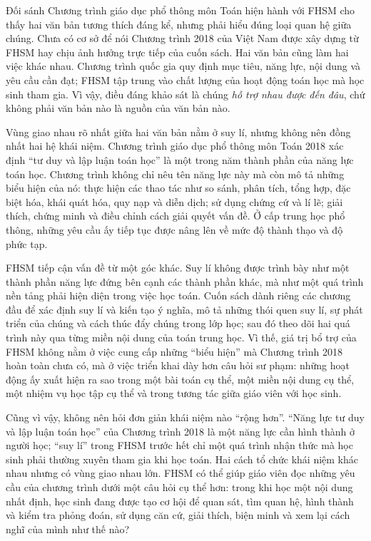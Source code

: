 Đối sánh Chương trình giáo dục phổ thông môn Toán hiện hành với FHSM cho thấy hai văn bản tương thích đáng kể, nhưng phải hiểu đúng loại quan hệ giữa chúng. Chưa có cơ sở để nói Chương trình 2018 của Việt Nam được xây dựng từ FHSM hay chịu ảnh hưởng trực tiếp của cuốn sách. Hai văn bản cũng làm hai việc khác nhau. Chương trình quốc gia quy định mục tiêu, năng lực, nội dung và yêu cầu
cần đạt; FHSM tập trung vào chất lượng của hoạt động toán học mà học sinh tham gia. Vì vậy, điều đáng khảo sát là chúng \emph{hỗ trợ nhau được đến đâu}, chứ không phải văn bản nào là nguồn của văn bản nào.

Vùng giao nhau rõ nhất giữa hai văn bản nằm ở suy lí, nhưng không nên đồng nhất hai hệ khái niệm. Chương trình giáo dục phổ thông môn Toán 2018 xác định “tư duy và lập luận toán học” là một trong năm thành phần của năng lực toán học. Chương trình không chỉ nêu tên năng lực này mà còn mô tả những biểu hiện của nó: thực hiện các thao tác như so sánh, phân tích, tổng hợp, đặc biệt hóa, khái quát hóa, quy nạp và diễn dịch; sử dụng chứng cứ và lí lẽ; giải thích, chứng minh và điều chỉnh cách giải quyết vấn đề. Ở cấp trung học phổ thông, những yêu cầu ấy tiếp tục được nâng lên về mức độ thành thạo và độ phức tạp.

FHSM tiếp cận vấn đề từ một góc khác. Suy lí không được trình bày như một thành phần năng lực đứng bên cạnh các thành phần khác, mà như một quá trình nền tảng phải hiện diện trong việc học toán. Cuốn sách dành riêng các chương đầu để xác định suy lí và kiến tạo ý nghĩa, mô tả những thói quen suy lí, sự phát triển của chúng và cách thúc đẩy chúng trong lớp học; sau đó theo dõi hai quá trình này qua từng miền nội dung của toán trung học. Vì thế, giá trị bổ trợ của FHSM không nằm ở việc cung cấp những “biểu hiện” mà Chương trình 2018 hoàn toàn chưa có, mà ở việc triển khai dày hơn câu hỏi sư phạm: những hoạt động ấy xuất hiện ra sao trong một bài toán cụ thể, một miền nội dung cụ thể, một nhiệm vụ học tập cụ thể và trong tương tác giữa giáo viên với học sinh.

Cũng vì vậy, không nên hỏi đơn giản khái niệm nào “rộng hơn”. “Năng lực tư duy và lập luận toán học” của Chương trình 2018 là một năng lực cần hình thành ở người học; “suy lí” trong FHSM trước hết chỉ một quá trình nhận thức mà học sinh phải thường xuyên tham gia khi học toán. Hai cách tổ chức khái niệm khác nhau nhưng có vùng giao nhau lớn. FHSM có thể giúp giáo viên đọc những yêu cầu của chương trình dưới một câu hỏi cụ thể hơn: trong khi học một nội dung nhất định, học sinh đang được tạo cơ hội để quan sát, tìm quan hệ, hình thành và kiểm tra phỏng đoán, sử dụng căn cứ, giải thích, biện minh và xem lại cách nghĩ của mình như thế nào?

